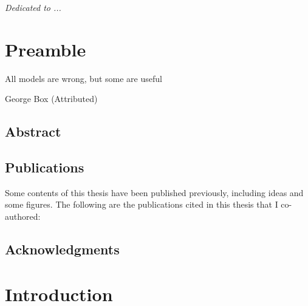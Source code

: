 \documentclass[
		twoside,openright,titlepage,numbers=noenddot,headinclude,%
	 	footinclude=true,cleardoublepage=empty,
		dottedtoc, %
		BCOR=5mm,paper=a4,fontsize=10pt, %
		ngerman,american, %
		]{scrreprt}
\begin{document}

\frenchspacing %
\raggedbottom %
\pagestyle{plain} %


\cleardoublepage
\vspace*{8cm}
\thispagestyle{empty}
\begin{center}
  \Large \emph{Dedicated to ...}
\end{center}
\cleardoublepage
\chapter*{Preamble}
\label{sec:preamble}
\epigraph{All models are wrong, but some are useful}{George Box (Attributed)}
\section*{Abstract}
\label{sec:abstract}

\cleardoublepage
\section*{Publications}
\label{sec:publications}
Some contents of this thesis have been published previously, including ideas and some figures. The following are the publications cited in this thesis that I co-authored: \\ \vspace{1cm}
\printbibliography[heading=none,keyword={contribution}]
\cleardoublepage
\section*{Acknowledgments}
\label{sec:acks}

\cleardoublepage
{}
\chapter{Introduction}

\end{document}
